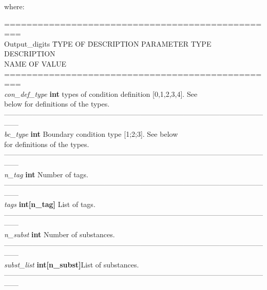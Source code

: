 \documentclass[a4paper]{article}
\begin{document}
\begin{flushleft}
where:
\end{flushleft}
\vspace{-20pt}
\small
\begin{tabbing}
=================================================\\
Output\_digits	\qquad \quad	\= TYPE OF \quad\qquad  	\=DESCRIPTION\kill
PARAMETER	 			 				\> TYPE		 					\>DESCRIPTION\\
NAME										\> OF VALUE					\>\\
=================================================\\
\textit{con\_def\_type} 	\> \textbf{int}						 types of condition definition [0,1,2,3,4]. See\\
													\> 												\>below for definitions of the types.\\
------------------------------------------------------------------------------------------------------------------\\
\textit{bc\_type}					\> \textbf{int}						\>Boundary condition type [1;2;3]. See below\\
													\> 												\>for definitions of the types.\\
------------------------------------------------------------------------------------------------------------------\\
\textit{n\_tag} 					\> \textbf{int}						\>Number of tags.\\
------------------------------------------------------------------------------------------------------------------\\
\textit{tags} 						\> \textbf{int[n\_tag]}	\>List of tags.\\
------------------------------------------------------------------------------------------------------------------\\
\textit{n\_subst}					\> \textbf{int}						\>Number of substances.\\
------------------------------------------------------------------------------------------------------------------\\
\textit{subst\_list}			\> \textbf{int[n\_subst]}\>List of substances.\\
------------------------------------------------------------------------------------------------------------------\\
\end{tabbing}
\end{document}
